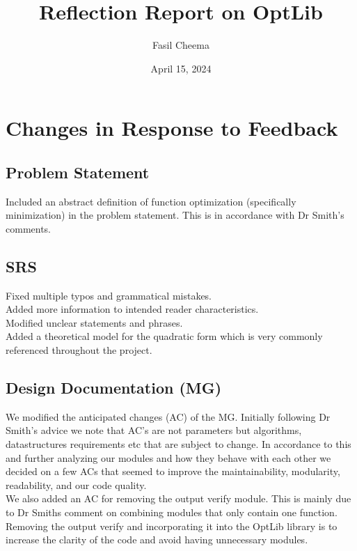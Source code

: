 \documentclass{article}
\title{Reflection Report on OptLib}
\author{Fasil Cheema}
\date{April 15, 2024}
\begin{document}
\maketitle


\section{Changes in Response to Feedback}



\subsection{Problem Statement}
Included an abstract definition of function optimization (specifically minimization) in the problem statement. This is in accordance with Dr Smith's comments. 
\subsection{SRS}
Fixed multiple typos and grammatical mistakes. 
\\

\noindent Added more information to intended reader characteristics.
\\

\noindent Modified unclear statements and phrases.
\\

\noindent Added a theoretical model for the quadratic form which is very commonly referenced throughout the project.

\subsection{Design Documentation (MG)}
We modified the anticipated changes (AC) of the MG. Initially following Dr Smith's advice we note that AC's are not parameters but algorithms, datastructures requirements etc that are subject to change. In accordance to this and further analyzing our modules and how they behave with each other we decided on a few ACs that seemed to improve the maintainability, modularity, readability, and our code quality.
\\

We also added an AC for removing the output verify module. This is mainly due to Dr Smiths comment on combining modules that only contain one function. Removing the output verify and incorporating it into the OptLib library is to increase the clarity of the code and avoid having unnecessary modules.
\end{document}
